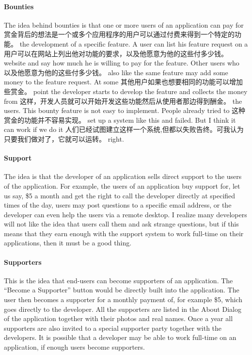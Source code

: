 \paragraph*{Bounties}

The idea behind bounties is that one or more users of an application can pay for
赏金背后的想法是一个或多个应用程序的用户可以通过付费来得到一个特定的功能。
the development of a specific feature. A user can list his feature request on a
用户可以在网站上列出他对功能的要求，以及他愿意为他的这些付多少钱。
website and say how much he is willing to pay for the feature. Other users who
以及他愿意为他的这些付多少钱。
also like the same feature may add some money to the feature request. At some
其他用户如果也想要相同的功能可以增加些赏金。
point the developer starts to develop the feature and collects the money from
这样，开发人员就可以开始开发这些功能然后从使用者那边得到酬金。
the users. This bounty feature is not easy to implement. People already tried to
这种赏金的功能并不容易实现。
set up a system like this and failed. But I think it can work if we do it
人们已经试图建立这样一个系统,但都以失败告终。可我认为只要我们做对了，它就可以运转。
right. 

\paragraph*{Support}

The idea is that the developer of an application sells direct support to the
users of the application. For example, the users of an application buy support
for, let us say, \$5 a month and get the right to call the developer directly at
specified times of the day, users may post questions to a specific email
address, or the developer can even help the users via a remote desktop. I
realize many developers will not like the idea that users call them and ask
strange questions, but if this means that they earn enough with the support
system to work full-time on their applications, then it must be a good thing.

\paragraph*{Supporters}

This is the idea that end-users can become supporters of an application. The
``Become a Supporter'' button would be directly built into the application. The
user then becomes a supporter for a monthly payment of, for example \$5, which
goes directly to the developer. All the supporters are listed in the About
Dialog of the application together with their photos and real names. Once a year
all supporters are also invited to a special supporter party together with the
developers. It is possible that a developer may be able to work full-time on an
application, if enough users become supporters.

